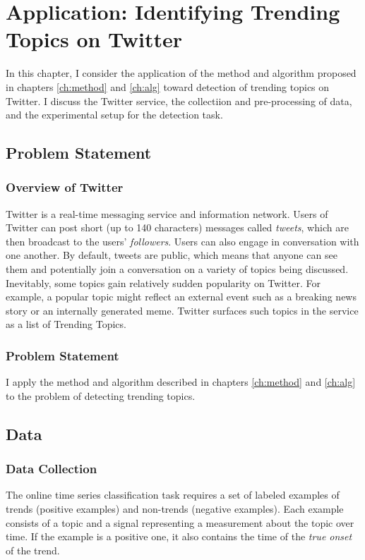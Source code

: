 \chapter{Application: Identifying Trending Topics on Twitter}
\label{ch:data}

In this chapter, I consider the application of the method and algorithm proposed
in chapters \ref{ch:method} and \ref{ch:alg} toward detection of trending topics
on Twitter. I discuss the Twitter service, the collectiion and pre-processing of
data, and the experimental setup for the detection task.

\section{Problem Statement}
\subsection{Overview of Twitter}
Twitter is a real-time messaging service and information network. Users of
Twitter can post short (up to 140 characters) messages called {\em tweets},
which are then broadcast to the users' {\em followers}. Users can also engage in
conversation with one another. By default, tweets are public, which means that
anyone can see them and potentially join a conversation on a variety of topics
being discussed. Inevitably, some topics gain relatively sudden popularity on
Twitter. For example, a popular topic might reflect an external event such as a
breaking news story or an internally generated meme. Twitter surfaces such
topics in the service as a list of Trending Topics.

\subsection{Problem Statement} %
I apply the method and algorithm described in chapters \ref{ch:method} and
\ref{ch:alg} to the problem of detecting trending topics. 


\section{Data}
\subsection{Data Collection}
The online time series classification task requires a set of labeled examples of
trends (positive examples) and non-trends (negative examples). Each example
consists of a topic and a signal representing a measurement about the topic over
time. If the example is a positive one, it also contains the time of the {\em
  true onset} of the trend.

